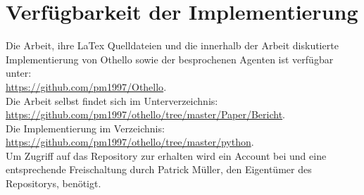\chapter*{Verfügbarkeit der Implementierung}
Die Arbeit, ihre LaTex Quelldateien und die innerhalb der Arbeit diskutierte Implementierung von Othello sowie der besprochenen Agenten ist verfügbar unter: 
\\\href{https://github.com/pm1997/Othello}{https://github.com/pm1997/Othello}.
\\Die Arbeit selbst findet sich im Unterverzeichnis:
\\\href{https://github.com/pm1997/othello/tree/master/Paper/Bericht}{https://github.com/pm1997/othello/tree/master/Paper/Bericht}.
\\Die Implementierung im Verzeichnis:
\\\href{https://github.com/pm1997/othello/tree/master/python}{https://github.com/pm1997/othello/tree/master/python}.
\\Um Zugriff auf das Repository zur erhalten wird ein Account bei  und eine entsprechende Freischaltung durch Patrick Müller, den Eigentümer des Repositorys, benötigt.  